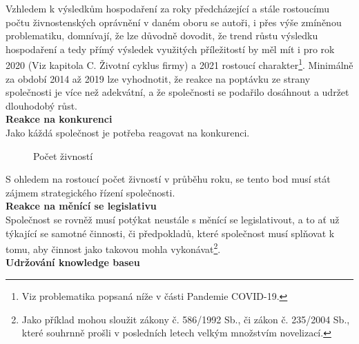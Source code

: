 \newpage

 Vzhledem k výsledkům hospodaření za roky předcházející a stále rostoucímu počtu živnostenských oprávnění v daném oboru se autoři, i přes výše zmíněnou problematiku, domnívají, že lze důvodně dovodit, že trend růstu výsledku hospodaření a tedy přímý výsledek využitých příležitostí by měl mít i pro rok 2020 (Viz kapitola C. Životní cyklus firmy) a 2021 rostoucí charakter\footnote{Viz problematika popsaná níže v části Pandemie COVID-19.}. Minimálně za období 2014 až 2019 lze vyhodnotit, že reakce na poptávku ze strany společnosti je více než adekvátní, a že společnosti se podařilo dosáhnout a udržet dlouhodobý růst.\\



\textbf{Reakce na konkurenci}\\

Jako káždá společnost je potřeba reagovat na konkurenci.

\begin{figure}[!htbp]
	\caption[Počet živností]{Počet živností}
	\label{fig:Pocet zivnosti}
\end{figure}

S ohledem na rostoucí počet živností v průběhu roku, se tento bod musí stát zájmem strategického řízení společnosti.\\

\textbf{Reakce na měnící se legislativu}\\

Společnost se rovněž musí potýkat neustále s měnící se legislativout, a to ať už týkající se samotné činnosti, či předpokladů, které společnost musí splňovat k tomu, aby činnost jako takovou mohla vykonávat\footnote{Jako příklad mohou sloužit zákony č. 586/1992 Sb., či zákon č. 235/2004 Sb., které souhrnně prošli v posledních letech velkým množstvím novelizací.}.\\

\textbf{Udržování knowledge baseu}\\

